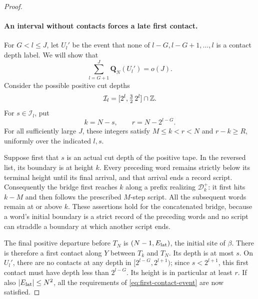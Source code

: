 \begin{proof}
\paragraph{An interval without contacts forces a late first contact.}
For $G<l\le J$, let $U_l'$ be the event that none of
$l-G,l-G+1,\ldots,l$ is a contact depth label.  We will show that
\begin{equation}\label{eq:uncovered-labels}
 \sum_{l=G+1}^J\mathbf Q_N(U_l')=o(J).
\end{equation}
Consider the possible positive cut depths
\[
 \mathcal I_l=[2^l,\tfrac32\,2^l]\cap\mathbb Z.
\]
For $s\in\mathcal I_l$, put
\begin{equation}\label{eq:lower-contact-parameters}
 k=N-s,\qquad r=N-2^{l-G}.
\end{equation}
For all sufficiently large $J$, these integers satisfy
$M\le k<r<N$ and $r-k\ge R$, uniformly over the indicated $l,s$.

Suppose first that $s$ is an actual cut depth of the positive tape.  In the
reversed list, its boundary is at height $k$.  Every preceding word remains
strictly below its terminal height until its final arrival, and that arrival
ends a record script.  Consequently the bridge first reaches $k$ along a
prefix realizing $\mathcal D_k^+$: it first hits $k-M$ and then follows the
prescribed $M$-step script.  All the subsequent words remain at or above $k$.
These assertions hold for the concatenated bridge, because a word's initial
boundary is a strict record of the preceding words and no script can straddle
a boundary at which another script ends.

The final positive departure before $T_N$ is $(N-1,E_{\rm lat})$, the initial
site of $\beta$.  There is therefore a first contact along $Y$ between $T_k$
and $T_N$.  Its depth is at most $s$.  On $U_l'$, there are no contacts at any
depth in $[2^{l-G},2^{l+1})$; since $s<2^{l+1}$, this first contact must have
depth less than $2^{l-G}$.  Its height is in particular at least $r$.  If also
$\lvert E_{\rm lat}\rvert\le N^2$, all the requirements of
\eqref{eq:first-contact-event} are now satisfied.


\end{proof}
